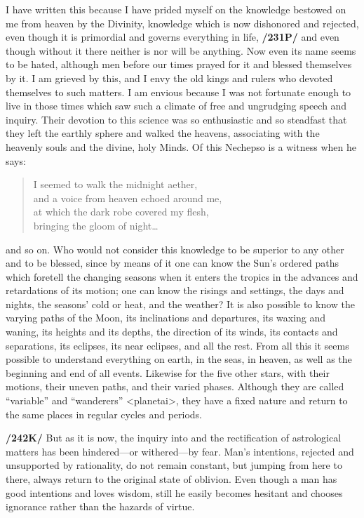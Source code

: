 I have written this because I have prided myself on the knowledge bestowed on me from heaven by the Divinity, knowledge which is now dishonored and rejected, even though it is primordial and governs everything in life, \textbf{/231P/} and even though without it there neither is nor will be anything. Now even its name seems to be hated, although men before our times prayed for it and blessed themselves by it. I am grieved by this, and I envy the old kings and rulers who devoted themselves to such matters. I am envious because I was not fortunate enough to live in those times which saw such a climate of free and ungrudging speech and inquiry. Their devotion to this science was so enthusiastic and so steadfast that they left the earthly sphere and walked the heavens, associating with the heavenly souls and the divine, holy Minds. Of this Nechepso is a witness when he says:
\begin{verse}
		I seemed to walk the midnight aether, \\
		and a voice from heaven echoed around me, \\
		at which the dark robe covered my flesh, \\
		bringing the gloom of night…\\
\end{verse}	
and so on. Who would not consider this knowledge to be superior to any other and to be blessed, since by means of it one can know the Sun’s ordered paths which foretell the changing seasons when it enters the tropics in the advances and retardations of its motion; one can know the risings and settings, the days and nights, the seasons’ cold or heat, and the weather? It is also possible to know the varying paths of the Moon, its inclinations and departures, its waxing and waning, its heights and its depths, the direction of its winds, its contacts and separations, its eclipses, its near eclipses, and all the rest. From all this it seems possible to understand everything on earth, in the seas, in heaven, as well as the beginning and end of all events. Likewise for the five other stars, with their motions, their uneven paths, and their varied phases. Although they are called “variable” and “wanderers” <planetai>, they have a fixed nature and return to the same places in regular cycles and periods. 

\textbf{/242K/} But as it is now, the inquiry into and the rectification of astrological matters has been hindered—or withered—by fear. Man’s intentions, rejected and unsupported by rationality, do not remain
constant, but jumping from here to there, always return to the original state of oblivion. Even though a man has good intentions and loves wisdom, still he easily becomes hesitant and chooses ignorance rather
than the hazards of virtue.

